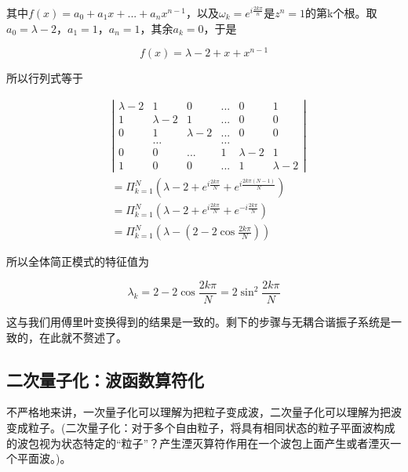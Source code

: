 其中$f(x)=a_0+a_1x+...+a_n x^{n-1}$，以及$\omega_k=e^{i\frac{2k\pi}{n}}$是$z^n=1$的第k个根。取$a_0=\lambda-2$，$a_1=1$，$a_n=1$，其余$a_k=0$，于是

\begin{equation}
    f(x)=\lambda-2+x+x^{n-1}
\end{equation}

所以行列式等于

\begin{equation}
    \begin{split}
        &\left|\begin{matrix}
            \lambda-2 & 1 & 0 & ... & 0 & 1 \\
            1 & \lambda-2 & 1 & ... & 0 & 0 \\
            0 & 1 & \lambda-2 & ... & 0 & 0 \\
            & \dots & & \dots &   \\
            0 & 0 & ... & 1 & \lambda-2 & 1 \\
            1 & 0 & 0 & ... & 1 & \lambda-2
        \end{matrix} \right| \\
        &=\Pi_{k=1}^N (\lambda-2+e^{i\frac{2k\pi}{N}}+e^{i\frac{2k\pi(N-1)}{N}}) \\
        &=\Pi_{k=1}^N (\lambda-2+e^{i\frac{2k\pi}{N}}+e^{-i\frac{2k\pi}{N}}) \\
        &=\Pi_{k=1}^N (\lambda-(2-2\cos\frac{2k\pi}{N}))
    \end{split}
\end{equation}

所以全体简正模式的特征值为

\begin{equation}
    \lambda_k=2-2\cos\frac{2k\pi}{N}=2\sin^2\frac{2k\pi}{N}
\end{equation}

这与我们用傅里叶变换得到的结果是一致的。剩下的步骤与无耦合谐振子系统是一致的，在此就不赘述了。



\subsection{二次量子化：波函数算符化}

不严格地来讲，一次量子化可以理解为把粒子变成波，二次量子化可以理解为把波变成粒子。(二次量子化：对于多个自由粒子，将具有相同状态的粒子平面波构成的波包视为状态特定的“粒子”？产生湮灭算符作用在一个波包上面产生或者湮灭一个平面波。)。

